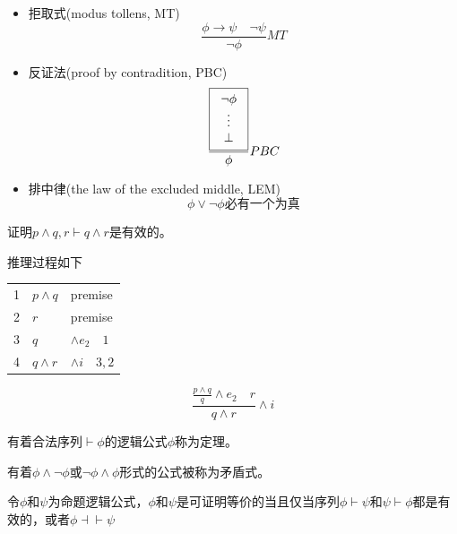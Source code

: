\begin{itemize}
	\item 拒取式(modus tollens, MT)
	\[\frac{\phi\to\psi\quad \lnot\psi}{\lnot\phi} MT\]
	\item 反证法(proof by contradition, PBC)
	\[\frac{\fbox{\begin{tabular}{c}$\lnot\phi$\\$\vdots$\\$\bot$\end{tabular}}}{\phi} PBC\]
	\item 排中律(the law of the excluded middle, LEM)
	\[\phi\lor\lnot\phi\text{必有一个为真}\]
\end{itemize}

\begin{example}
证明$p\land q,r\vdash q\land r$是有效的。
\end{example}
\begin{analysis}
推理过程如下
\begin{center}
\begin{tabular}{lll}
1 & $p\land q$ & premise\\
2 & $r$ & premise\\
3 & $q$ & $\land e_2\quad 1$\\
4 & $q\land r$ & $\land i\quad 3,2$
\end{tabular}
\end{center}
\[\frac{\frac{p\land q}{q}\land e_2\quad r}{q\land r}\land i\]
\end{analysis}

\begin{definition}[定理(theorem)]
有着合法序列$\vdash\phi$的逻辑公式$\phi$称为定理。
\end{definition}
\begin{definition}
有着$\phi\land\lnot\phi$或$\lnot\phi\land\phi$形式的公式被称为矛盾式。
\end{definition}

\begin{definition}
令$\phi$和$\psi$为命题逻辑公式，$\phi$和$\psi$是可证明等价的当且仅当序列$\phi\vdash\psi$和$\psi\vdash\phi$都是有效的，或者$\phi\dashv\vdash\psi$
\end{definition}

